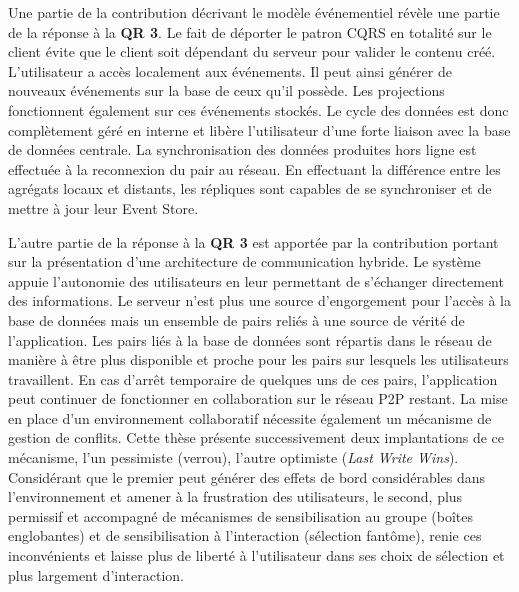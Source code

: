 Une partie de la contribution décrivant le modèle événementiel révèle une partie de 
la réponse à la \textbf{QR 3}.
Le fait de déporter le patron \gls{CQRS} en totalité sur le client évite que le client 
soit dépendant du serveur pour valider le contenu créé. L'utilisateur a accès 
localement aux événements. Il peut ainsi générer de nouveaux événements sur la 
base de ceux qu'il possède. Les projections fonctionnent également sur ces 
événements stockés. Le cycle des données est donc complètement géré en 
interne et libère l'utilisateur d'une forte liaison avec la base de données centrale. 
La synchronisation des données produites hors ligne est effectuée à la 
reconnexion du pair au réseau. En effectuant la différence entre les agrégats 
locaux et distants, les répliques sont capables de se synchroniser et de mettre à 
jour leur Event Store. 

L'autre partie de la réponse à la \textbf{QR 3} est apportée par la contribution 
portant sur la présentation d'une architecture de communication hybride. Le 
système appuie l'autonomie des utilisateurs en leur permettant de s'échanger 
directement des 
informations. Le serveur n'est plus une source d'engorgement pour l'accès à la 
base de données mais un ensemble de pairs reliés à une source de vérité de 
l'application. Les pairs liés à la base de données sont répartis dans le réseau de 
manière à être plus disponible et proche pour les pairs sur lesquels les utilisateurs 
travaillent. En cas d'arrêt temporaire de quelques uns de ces pairs, l'application 
peut continuer de fonctionner en collaboration sur le réseau \gls{P2P} restant. 
La mise en place d'un environnement collaboratif nécessite également un 
mécanisme de gestion de conflits. Cette thèse présente successivement deux 
implantations de ce mécanisme, l'un pessimiste (verrou), l'autre optimiste 
(\textit{Last Write Wins}). 
Considérant que le premier peut générer des effets de bord considérables dans 
l'environnement et amener à la frustration des utilisateurs, le second, plus 
permissif et accompagné de mécanismes de sensibilisation au groupe (boîtes 
englobantes) et de sensibilisation à l'interaction (sélection fantôme), 
renie ces inconvénients et laisse plus de liberté à l'utilisateur dans ses choix de 
sélection et plus largement d'interaction.
%

